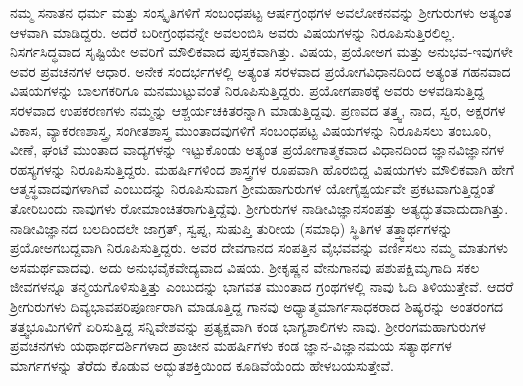 ನಮ್ಮ ಸನಾತನ ಧರ್ಮ ಮತ್ತು ಸಂಸ್ಕೃತಿಗಳಿಗೆ ಸಂಬಂಧಪಟ್ಟ ಆರ್ಷಗ್ರಂಥಗಳ ಅವಲೋಕನವನ್ನು ಶ್ರೀಗುರುಗಳು ಅತ್ಯಂತ ಆಳವಾಗಿ ಮಾಡಿದ್ದರು. ಅದರೆ ಬರೀಗ್ರಂಥವನ್ನೇ ಅವಲಂಬಿಸಿ ಅವರು ವಿಷಯಗಳನ್ನು ನಿರೂಪಿಸುತ್ತಿರಲಿಲ್ಲ. ನಿಸರ್ಗಸಿದ್ಧವಾದ ಸೃಷ್ಟಿಯೇ ಅವರಿಗೆ ಮೌಲಿಕವಾದ ಪುಸ್ತಕವಾಗಿತ್ತು. ವಿಷಯ, ಪ್ರಯೋಅಗ ಮತ್ತು ಅನುಭವ-ಇವುಗಳೇ ಅವರ ಪ್ರವಚನಗಳ ಆಧಾರ. ಅನೇಕ ಸಂದರ್ಭಗಳಲ್ಲಿ ಅತ್ಯಂತ ಸರಳವಾದ ಪ್ರಯೋಗವಿಧಾನದಿಂದ ಅತ್ಯಂತ ಗಹನವಾದ
ವಿಷಯಗಳನ್ನು ಬಾಲಗಕರಿಗೂ ಮನಮುಟ್ಟುವಂತೆ ನಿರೂಪಿಸುತ್ತಿದ್ದರು. ಪ್ರಯೋಗಪಾಠಕ್ಕೆ  ಅವರು ಅಳವಡಿಸುತ್ತಿದ್ದ ಸರಳವಾದ ಉಪಕರಣಗಳು ನಮ್ಮನ್ನು ಆಶ್ಚರ್ಯಚಕಿತರನ್ನಾಗಿ ಮಾಡುತ್ತಿದ್ದವು. ಪ್ರಣವದ ತತ್ತ್ವ, ನಾದ, ಸ್ವರ, ಅಕ್ಷರಗಳ ವಿಕಾಸ, ವ್ಯಾಕರಣಶಾಸ್ತ್ರ, ಸಂಗೀತಶಾಸ್ತ್ರ ಮುಂತಾದವುಗಳಿಗೆ ಸಂಬಂಧಪಟ್ಟ ವಿಷಯಗಳನ್ನು ನಿರೂಪಿಸಲು ತಂಬೂರಿ, ವೀಣೆ, ಘಂಟೆ ಮುಂತಾದ ವಾದ್ಯಗಳನ್ನು ಇಟ್ಟುಕೊಂಡು ಅತ್ಯಂತ ಪ್ರಯೋಗಾತ್ಮಕವಾದ ವಿಧಾನದಿಂದ ಜ್ಞಾನವಿಜ್ಞಾನಗಳ ರಹಸ್ಯಗಳನ್ನು  ನಿರೂಪಿಸುತ್ತಿದ್ದರು. ಮಹರ್ಷಿಗಳಿಂದ ಶಾಸ್ತ್ರಗಳ ರೂಪವಾಗಿ ಹೊರಬಿದ್ದ ವಿಷಯಗಳು ಮೌಲಿಕವಾಗಿ ಹೇಗೆ ಆತ್ಮಸ್ಥವಾದವುಗಳಾಗಿವೆ ಎಂಬುದನ್ನು ನಿರೂಪಿಸುವಾಗ ಶ್ರೀಮಹಾಗುರುಗಳ ಯೋಗೈಶ್ವರ್ಯವೇ ಪ್ರಕಟವಾಗುತ್ತಿದ್ದಂತೆ ತೋರಿಬಂದು ನಾವುಗಳು ರೋಮಾಂಚಿತರಾಗುತ್ತಿದ್ದೆವು. ಶ್ರೀಗುರುಗಳ ನಾಡೀವಿಜ್ಞಾನಸಂಪತ್ತು ಅತ್ಯದ್ಭುತವಾದುದಾಗಿತ್ತು. ನಾಡೀವಿಜ್ಞಾನದ ಬಲದಿಂದಲೇ ಜಾಗ್ರತ್, ಸ್ವಪ್ನ, ಸುಷುಪ್ತಿ ತುರೀಯ (ಸಮಾಧಿ) ಸ್ಥಿತಿಗಳ ತತ್ತ್ವಾರ್ಥಗಳನ್ನು ಪ್ರಯೋಅಗಬದ್ದವಾಗಿ ನಿರೂಪಿಸುತ್ತಿದ್ದರು. ಅವರ ದೇವಗಾನದ ಸಂಪತ್ತಿನ ವೈಭವವನ್ನು ವರ್ಣಿಸಲು ನಮ್ಮ ಮಾತುಗಳು ಅಸಮರ್ಥವಾದವು. ಅದು ಅನುಭವೈಕವೇದ್ಯವಾದ ವಿಷಯ. ಶ್ರೀಕೃಷ್ಣನ ವೇನುಗಾನವು ಪಶುಪಕ್ಷಿಮೃಗಾದಿ ಸಕಲ ಜೀವಗಳನ್ನೂ ತನ್ಮಯಗೊಳಿಸುತ್ತಿತ್ತು ಎಂಬುದನ್ನು  ಭಾಗವತ ಮುಂತಾದ ಗ್ರಂಥಗಳಲ್ಲಿ ನಾವು ಓದಿ ತಿಳಿಯುತ್ತೇವೆ. ಆದರೆ ಶ್ರೀಗುರುಗಳು ದಿವ್ಯಭಾವಪರಿಪೂರ್ಣರಾಗಿ ಮಾಡೂತ್ತಿದ್ದ ಗಾನವು ಅಧ್ಯಾತ್ಮಮಾರ್ಗಸಾಧಕರಾದ ಶಿಷ್ಯರನ್ನು ಅಂತರಂಗದ ತತ್ತ್ವಭೂಮಿಗಳಿಗೆ ಏರಿಸುತ್ತಿದ್ದ ಸನ್ನಿವೇಶವನ್ನು ಪ್ರತ್ಯಕ್ಷವಾಗಿ ಕಂಡ ಭಾಗ್ಯಶಾಲಿಗಳು ನಾವು. ಶ್ರೀರಂಗಮಹಾಗುರುಗಳ ಪ್ರವಚನಗಳು ಯಥಾರ್ಥದರ್ಶಿಗಳಾದ ಪ್ರಾಚೀನ ಮಹರ್ಷಿಗಳು ಕಂಡ ಜ್ಞಾನ-ವಿಜ್ಞಾನಮಯ ಸತ್ಯಾರ್ಥಗಳ ಮಾರ್ಗಗಳನ್ನು ತೆರೆದು ಕೊಡುವ ಅದ್ಭುತಶಕ್ತಿಯಿಂದ ಕೂಡಿವೆಯೆಂದು ಹೇಳಬಯಸುತ್ತೇವೆ. 


